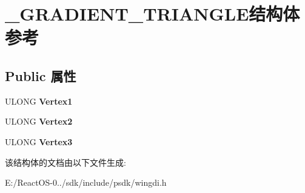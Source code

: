 \hypertarget{struct___g_r_a_d_i_e_n_t___t_r_i_a_n_g_l_e}{}\section{\+\_\+\+G\+R\+A\+D\+I\+E\+N\+T\+\_\+\+T\+R\+I\+A\+N\+G\+L\+E结构体 参考}
\label{struct___g_r_a_d_i_e_n_t___t_r_i_a_n_g_l_e}
\subsection*{Public 属性}
\begin{DoxyCompactItemize}
\item 
\mbox{\label{struct___g_r_a_d_i_e_n_t___t_r_i_a_n_g_l_e_ad33445e534b375f8178c5551d360a8da}} 
U\+L\+O\+NG {\bfseries Vertex1}
\item 
\mbox{\label{struct___g_r_a_d_i_e_n_t___t_r_i_a_n_g_l_e_a13daa741f4690377f56aaf269a8d9269}} 
U\+L\+O\+NG {\bfseries Vertex2}
\item 
\mbox{\label{struct___g_r_a_d_i_e_n_t___t_r_i_a_n_g_l_e_a8328f1cb210b4275fbede6b6a3700095}} 
U\+L\+O\+NG {\bfseries Vertex3}
\end{DoxyCompactItemize}


该结构体的文档由以下文件生成\+:\begin{DoxyCompactItemize}
\item 
E\+:/\+React\+O\+S-\/0../sdk/include/psdk/wingdi.\+h\end{DoxyCompactItemize}
